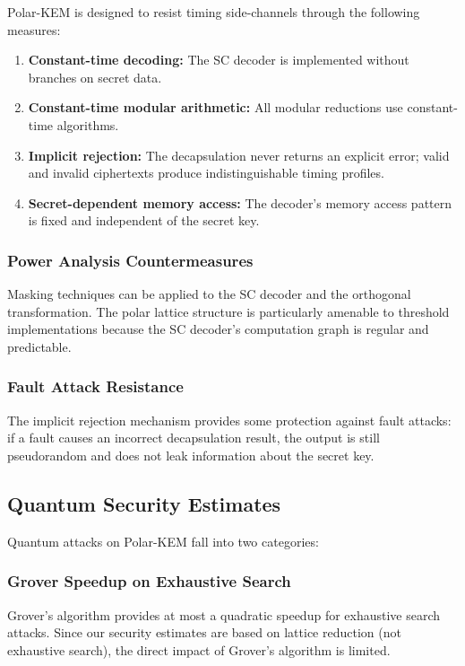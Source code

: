 \documentclass[11pt,a4paper]{article}
\newcommand{\polarKem}{\textsf{Polar-KEM}\xspace}
\begin{document}
\polarKem is designed to resist timing side-channels through the following measures:

\begin{enumerate}[leftmargin=2em]
\item \textbf{Constant-time decoding:} The SC decoder is implemented without branches on secret data.
\item \textbf{Constant-time modular arithmetic:} All modular reductions use constant-time algorithms.
\item \textbf{Implicit rejection:} The decapsulation never returns an explicit error; valid and invalid ciphertexts produce indistinguishable timing profiles.
\item \textbf{Secret-dependent memory access:} The decoder's memory access pattern is fixed and independent of the secret key.
\end{enumerate}

\subsubsection{Power Analysis Countermeasures}

Masking techniques can be applied to the SC decoder and the orthogonal transformation. The polar lattice structure is particularly amenable to threshold implementations because the SC decoder's computation graph is regular and predictable.

\subsubsection{Fault Attack Resistance}

The implicit rejection mechanism provides some protection against fault attacks: if a fault causes an incorrect decapsulation result, the output is still pseudorandom and does not leak information about the secret key.

\subsection{Quantum Security Estimates}\label{sec:quantum}

Quantum attacks on \polarKem fall into two categories:

\subsubsection{Grover Speedup on Exhaustive Search}

Grover's algorithm provides at most a quadratic speedup for exhaustive search attacks. Since our security estimates are based on lattice reduction (not exhaustive search), the direct impact of Grover's algorithm is limited.
\end{document}
